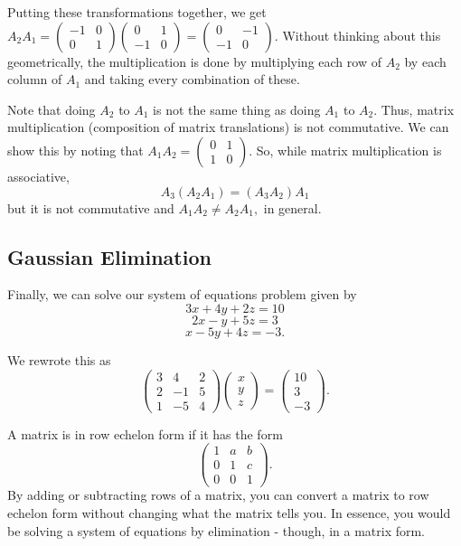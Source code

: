 \documentclass[
]{book}
\theoremstyle{definition}
\theoremstyle{definition}
\theoremstyle{definition}
\theoremstyle{definition}
\theoremstyle{remark}
\begin{document}
Putting these transformations together, we get \(A_2 A_1 = \begin{pmatrix} -1 & 0\\0 & 1 \end{pmatrix} \begin{pmatrix} 0 &1\\ -1 & 0 \end{pmatrix}= \begin{pmatrix}0 & -1\\ -1 & 0 \end{pmatrix}\). Without thinking about this geometrically, the multiplication is done by multiplying each row of \(A_2\) by each column of \(A_1\) and taking every combination of these.

Note that doing \(A_2\) to \(A_1\) is not the same thing as doing \(A_1\) to \(A_2\). Thus, matrix multiplication (composition of matrix translations) is not commutative. We can show this by noting that \(A_1 A_2 = \begin{pmatrix} 0 & 1\\ 1 & 0 \end{pmatrix}\). So, while matrix multiplication is associative, \[A_3(A_2A_1) = (A_3A_2)A_1\] but it is not commutative and \(A_1A_2 \not = A_2A_1,\) in general.

\hypertarget{gaussian-elimination}{%
\subsection{Gaussian Elimination}\label{gaussian-elimination}}

Finally, we can solve our system of equations problem given by
\[3x + 4y + 2z= 10\] \[2x - y + 5z= 3\] \[x-5y + 4z = -3.\]

We rewrote this as \[\begin{pmatrix}3 & 4 & 2\\ 2 & -1 & 5\\ 1 & -5 & 4 \end{pmatrix} \begin{pmatrix}x \\ y \\ z \end{pmatrix} = \begin{pmatrix}10 \\ 3 \\ -3 \end{pmatrix}.\]

A matrix is in row echelon form if it has the form \[\begin{pmatrix}1 & a & b\\0 & 1 & c \\ 0 & 0 & 1 \end{pmatrix}.\] By adding or subtracting rows of a matrix, you can convert a matrix to row echelon form without changing what the matrix tells you. In essence, you would be solving a system of equations by elimination - though, in a matrix form.
\end{document}
